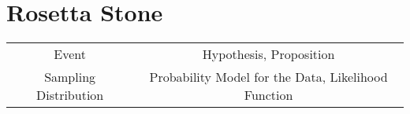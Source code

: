 \chapter{Rosetta Stone}

\begin{table}
\begin{center}
\begin{tabular}{cc}
Event & Hypothesis, Proposition \\
Sampling Distribution & Probability Model for the Data, Likelihood Function \\

\end{tabular}
\end{center}
\end{table}
